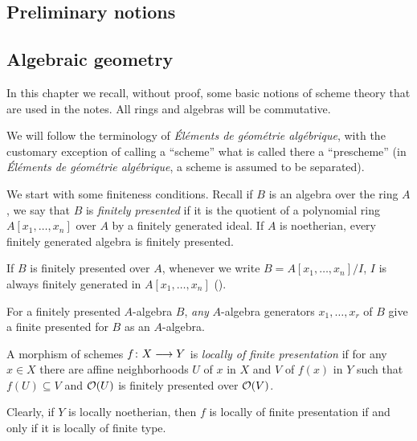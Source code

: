 \begin{1   PRELIMINARY NOTIONS}
\setcounter{chapter}{0}
\chapter{Preliminary notions} \label{ch:recall}
\begin{1.1 Algebraic geometry}
\setcounter{section}{0}
\section{Algebraic geometry}

In this chapter we recall, without proof, some basic notions of scheme theory that are used in the notes. All rings and algebras will be commutative.

We will follow the terminology of \emph{\'{E}l\'ements de g\'eom\'etrie alg\'ebrique}, with the customary exception of calling a ``scheme'' what is called there a ``prescheme'' (in \emph{\'{E}l\'ements de g\'eom\'etrie alg\'ebrique}, a scheme is assumed to be separated).

We start with some finiteness conditions. Recall if $B$ is an algebra over the ring $A$, we say that $B$ is \emph{finitely presented} if it is the quotient of a polynomial ring $A[x_1, \dots, x_n]$ over $A$ by a finitely generated ideal. If $A$ is noetherian, every finitely generated algebra is finitely presented.

If $B$ is finitely presented over $A$, whenever we write $B = A[x_1, \dots, x_n]/I$, $I$ is always finitely generated in $A[x_1, \dots, x_n]$ (\cite[Proposition~1.4.4]{ega4-1}).
\begin{shaded}
For a finitely presented $A$-algebra $B$, \emph{any} $A$-algebra generators $x_1,\ldots,x_r$ of $B$ give a finite presented for $B$ as an $A$-algebra.
\end{shaded}


\begin{definition}
A morphism of schemes $f \colon X \arr Y$ is \emph{locally of finite presentation}
if for any $x \in X$ there are affine neighborhoods $U$ of $x$ in $X$ and $V$ of $f(x)$ in $Y$ such that $f(U) \subseteq V$ and $\mathcal{O}(U)$ is finitely presented over $\mathcal{O}(V)$.
\end{definition}

Clearly, if $Y$ is locally noetherian, then $f$ is locally of finite presentation if and only if it is locally of finite type.


\end{1.1 Algebraic geometry}
\end{1   PRELIMINARY NOTIONS}
